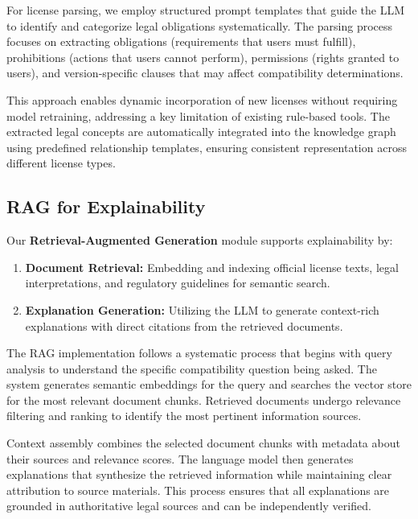 \documentclass[9pt,twocolumn]{article}
\begin{document}
For license parsing, we employ structured prompt templates that guide the LLM to identify and categorize legal obligations systematically. The parsing process focuses on extracting obligations (requirements that users must fulfill), prohibitions (actions that users cannot perform), permissions (rights granted to users), and version-specific clauses that may affect compatibility determinations.

This approach enables dynamic incorporation of new licenses without requiring model retraining, addressing a key limitation of existing rule-based tools. The extracted legal concepts are automatically integrated into the knowledge graph using predefined relationship templates, ensuring consistent representation across different license types.

\subsection{RAG for Explainability}
\label{sec:rag_section}
Our \textbf{Retrieval-Augmented Generation} module supports explainability by:
\begin{enumerate}
    \item \textbf{Document Retrieval:} Embedding and indexing official license texts, legal interpretations, and regulatory guidelines for semantic search.
    \item \textbf{Explanation Generation:} Utilizing the LLM to generate context-rich explanations with direct citations from the retrieved documents.
\end{enumerate}

The RAG implementation follows a systematic process that begins with query analysis to understand the specific compatibility question being asked. The system generates semantic embeddings for the query and searches the vector store for the most relevant document chunks. Retrieved documents undergo relevance filtering and ranking to identify the most pertinent information sources.

Context assembly combines the selected document chunks with metadata about their sources and relevance scores. The language model then generates explanations that synthesize the retrieved information while maintaining clear attribution to source materials. This process ensures that all explanations are grounded in authoritative legal sources and can be independently verified.
\end{document}
